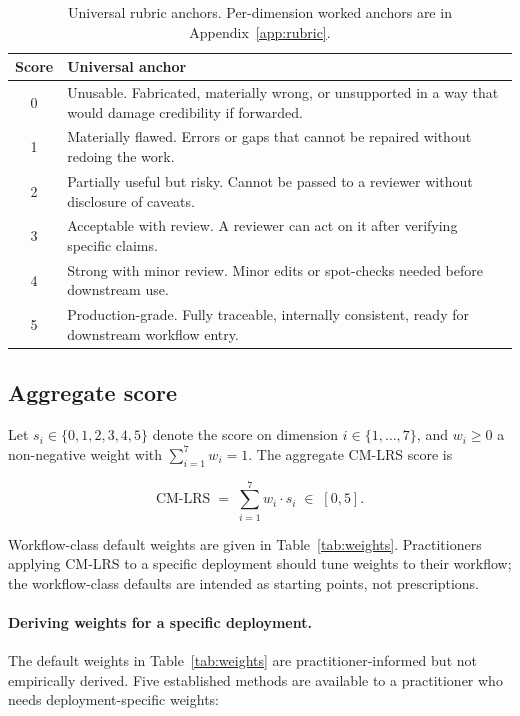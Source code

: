\documentclass[11pt]{article}
\begin{document}
\begin{table}[h]
\centering
\caption{Universal rubric anchors. Per-dimension worked anchors are in Appendix~\ref{app:rubric}.}
\label{tab:rubric}
\small
\begin{tabularx}{\textwidth}{@{}cX@{}}
\toprule
\textbf{Score} & \textbf{Universal anchor} \\
\midrule
0 & Unusable. Fabricated, materially wrong, or unsupported in a way that would damage credibility if forwarded. \\
1 & Materially flawed. Errors or gaps that cannot be repaired without redoing the work. \\
2 & Partially useful but risky. Cannot be passed to a reviewer without disclosure of caveats. \\
3 & Acceptable with review. A reviewer can act on it after verifying specific claims. \\
4 & Strong with minor review. Minor edits or spot-checks needed before downstream use. \\
5 & Production-grade. Fully traceable, internally consistent, ready for downstream workflow entry. \\
\bottomrule
\end{tabularx}
\end{table}

\subsection{Aggregate score}

Let $s_i \in \{0,1,2,3,4,5\}$ denote the score on dimension $i \in \{1,\ldots,7\}$, and $w_i \geq 0$ a non-negative weight with $\sum_{i=1}^{7} w_i = 1$. The aggregate CM-LRS score is

\begin{equation}
\mathrm{CM\text{-}LRS} \;=\; \sum_{i=1}^{7} w_i \cdot s_i \;\in\; [0,5].
\label{eq:cmlrs}
\end{equation}

Workflow-class default weights are given in Table~\ref{tab:weights}. Practitioners applying CM-LRS to a specific deployment should tune weights to their workflow; the workflow-class defaults are intended as starting points, not prescriptions.

\paragraph{Deriving weights for a specific deployment.} The default weights in Table~\ref{tab:weights} are practitioner-informed but not empirically derived. Five established methods are available to a practitioner who needs deployment-specific weights:
\end{document}
